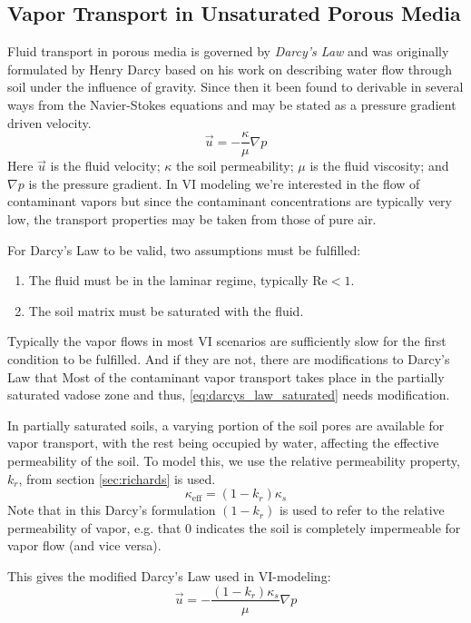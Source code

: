 \subsection{Vapor Transport in Unsaturated Porous Media}\label{sec:darcys}

Fluid transport in porous media is governed by \textit{Darcy's Law} and was originally formulated by Henry Darcy based on his work on describing water flow through soil under the influence of gravity.
Since then it been found to derivable in several ways from the Navier-Stokes equations\cite{bear_dynamics_1972} and may be stated as a pressure gradient driven velocity.
\begin{equation}\label{eq:darcys_law_saturated}
  \vec{u} = -\frac{\kappa}{\mu}\nabla p
\end{equation}
Here $\vec{u}$ is the fluid velocity; $\kappa$ the soil permeability; $\mu$ is the fluid viscosity; and $\nabla p$ is the pressure gradient.
In VI modeling we're interested in the flow of contaminant vapors but since the contaminant concentrations are typically very low, the transport properties may be taken from those of pure air.\par


For Darcy's Law to be valid, two assumptions must be fulfilled:
\begin{enumerate}
  \item The fluid must be in the laminar regime, typically $\mathrm{Re} < 1$.
  \item The soil matrix must be saturated with the fluid.
\end{enumerate}
Typically the vapor flows in most VI scenarios are sufficiently slow for the first condition to be fulfilled.
And if they are not, there are modifications to Darcy's Law that
Most of the contaminant vapor transport takes place in the partially saturated vadose zone and thus, \eqref{eq:darcys_law_saturated} needs modification.\par

In partially saturated soils, a varying portion of the soil pores are available for vapor transport, with the rest being occupied by water, affecting the effective permeability of the soil.
To model this, we use the relative permeability property, $k_r$, from section \ref{sec:richards} is used.
\begin{equation}
  \kappa_\mathrm{eff} = (1-k_r) \kappa_s
\end{equation}
Note that in this Darcy's formulation $(1 - k_r)$ is used to refer to the relative permeability of vapor, e.g. that 0 indicates the soil is completely impermeable for vapor flow (and vice versa).\par
This gives the modified Darcy's Law used in VI-modeling:
\begin{equation}\label{eq:darcys_law}
  \vec{u} = -\frac{(1-k_r) \kappa_s}{\mu}\nabla p
\end{equation}

